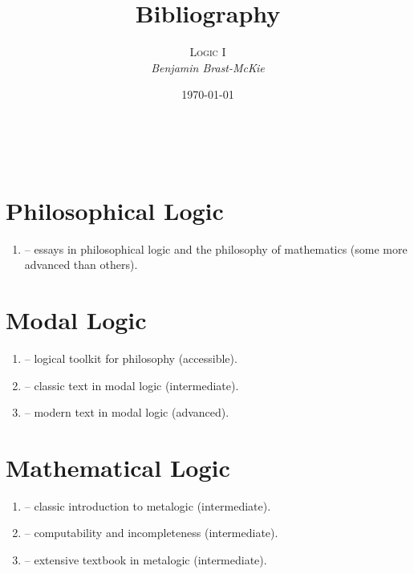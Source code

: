 \documentclass[a4paper, 11pt]{article} %
\title{\textbf{Bibliography}} %
\author{\textsc{Logic I}\\ \em Benjamin Brast-McKie} %
\date{\today} %
\makeatletter
\renewcommand{\maketitle}{
\begin{flushright}
{\LARGE\@title}

\vspace{10pt}

{\@author}
\\ \@date
\end{flushright}

\vspace{-20pt}

}
\makeatother
\begin{document}
\maketitle %

\thispagestyle{empty}


\section*{Philosophical Logic}%
  \label{sec:PhilosophicalLogic}

  \begin{enumerate}
    \item \cite{Boolos1999} -- essays in philosophical logic and the philosophy of mathematics (some more advanced than others).
  \end{enumerate}




\section*{Modal Logic}%
  \label{sec:ModalLogic}

  \begin{enumerate}
    \item \cite{Sider2010} -- logical toolkit for philosophy (accessible).
    \item \cite{Hughes1996} -- classic text in modal logic (intermediate).
    \item \cite{Blackburn2002} -- modern text in modal logic (advanced).
  \end{enumerate}



\section*{Mathematical Logic}%
  \label{sec:MathematicalLogic}

  \begin{enumerate}
    \item \cite{Enderton2001} -- classic introduction to metalogic (intermediate).
    \item \cite{Boolos2007} -- computability and incompleteness (intermediate).
    \item \cite{Mendelson2015} -- extensive textbook in metalogic (intermediate).
  \end{enumerate}
\end{document}

